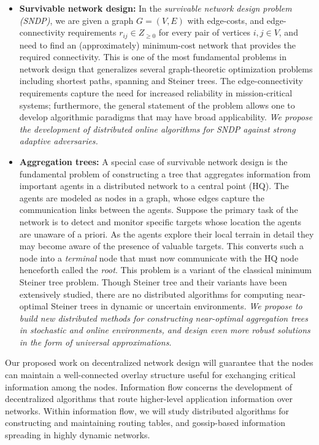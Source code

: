 \begin{itemize}
\item
{\bf Survivable network design:} In the {\em survivable network design
  problem (SNDP)}, we are given a graph $G = (V,E)$ with edge-costs,
and edge-connectivity requirements $r_{ij} \in Z_{\ge 0}$ for every
pair of vertices $i, j \in V$, and need to find an (approximately)
minimum-cost network that provides the required connectivity.  This is
one of the most fundamental problems in network design that
generalizes several graph-theoretic optimization problems including
shortest paths, spanning and Steiner trees.  The edge-connectivity
requirements capture the need for increased reliability in
mission-critical systems; furthermore, the general statement of the
problem allows one to develop algorithmic paradigms that may have
broad applicability. {\em We propose the development of distributed
  online algorithms for SNDP against strong adaptive adversaries.}

\item
{\bf Aggregation trees:} A special case of survivable network design
is the fundamental problem of constructing a tree that aggregates
information from important agents in a distributed network to a
central point (HQ). The agents are modeled as nodes in a graph, whose
edges capture the communication links between the agents.  Suppose the
primary task of the network is to detect and monitor specific targets
whose location the agents are unaware of a priori.  As the agents
explore their local terrain in detail they may become aware of the
presence of valuable targets. This converts such a node into a {\em
  terminal} node that must now communicate with the HQ node henceforth
called the {\em root}.  This problem is a variant of the classical
minimum Steiner tree problem.  Though Steiner tree and their variants
have been extensively studied, there are no distributed algorithms for
computing near-optimal Steiner trees in dynamic or uncertain
environments.  {\em We propose to build new distributed methods for
  constructing near-optimal aggregation trees in stochastic and online
  environments, and design even more robust solutions in the form of
  universal approximations}.
\end{itemize}

 Our proposed work on decentralized network
design will guarantee that the nodes can maintain a well-connected
overlay structure useful for exchanging critical information among the
nodes.  Information flow concerns the development of decentralized
algorithms that route higher-level application information over
networks.  Within information flow, we will study distributed
algorithms for constructing and maintaining routing tables, and
gossip-based information spreading in highly dynamic networks.


